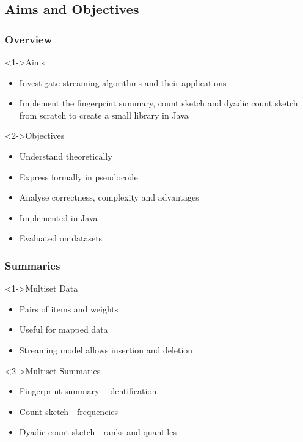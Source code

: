 \subsection{Aims and Objectives}

\begin{frame}
  \frametitle{Overview}

  \begin{block}<1->{Aims}
    \begin{itemize}
      \item Investigate streaming algorithms and their applications
      \item Implement the fingerprint summary, count sketch and dyadic count sketch from scratch to create a small library in Java
    \end{itemize}
  \end{block}

  \begin{block}<2->{Objectives}
    \begin{itemize}
      \item Understand theoretically
      \item Express formally in pseudocode
      \item Analyse correctness, complexity and advantages
      \item Implemented in Java
      \item Evaluated on datasets
    \end{itemize}
  \end{block}

\end{frame}

\begin{frame}
  \frametitle{Summaries}

  \begin{block}<1->{Multiset Data}
    \begin{itemize}
      \item Pairs of items and weights
      \item Useful for mapped data
      \item Streaming model allows insertion and deletion
    \end{itemize}
  \end{block}

  \begin{block}<2->{Multiset Summaries}
    \begin{itemize}
      \item<2-> Fingerprint summary---identification
      \item<3-> Count sketch---frequencies
      \item<4-> Dyadic count sketch---ranks and quantiles
    \end{itemize}
  \end{block}
\end{frame}

